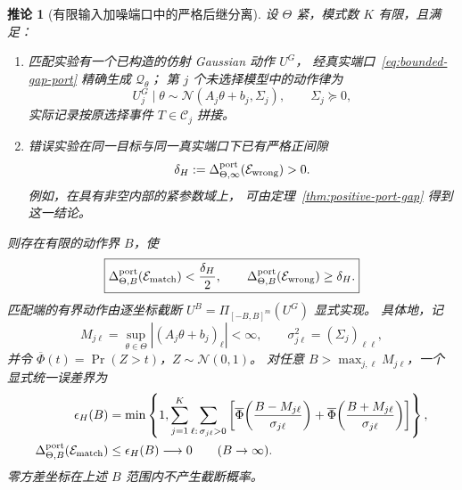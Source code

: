 \documentclass[UTF8,fontset=fandol,zihao=5,a4paper]{ctexart}
\newtheorem{corollary}[theorem]{推论}
\theoremstyle{definition}
\theoremstyle{remark}\newtheorem{remark}[theorem]{说明}
\numberwithin{equation}{section}
\begin{document}
\begin{corollary}[有限输入加噪端口中的严格后继分离]
\label{cor:bounded-port-separation}
设 $\Theta$ 紧，模式数 $K$ 有限，且满足：
\begin{enumerate}
\item 匹配实验有一个已构造的仿射 Gaussian 动作 $U^G$，
      经真实端口~\eqref{eq:bounded-gap-port} 精确生成 $\mathcal Q_\theta$；
      第 $j$ 个未选择模型中的动作律为
      \[
       U_j^G\mid\theta\sim
       \mathcal N(A_j\theta+b_j,\Sigma_j),\qquad \Sigma_j\succeq0,
      \]
      实际记录按原选择事件 $T\in\mathcal C_j$ 拼接。
\item 错误实验在同一目标与同一真实端口下已有严格正间隙
      \[
       \delta_H:=\Delta_{\Theta,\infty}^{\rm port}
                         (\mathcal E_{\rm wrong})>0.
      \]
      例如，在具有非空内部的紧参数域上，
      可由定理~\ref{thm:positive-port-gap} 得到这一结论。
\end{enumerate}
则存在有限的动作界 $B$，使
\begin{equation}
 \boxed{
 \Delta_{\Theta,B}^{\rm port}(\mathcal E_{\rm match})
 <\frac{\delta_H}{2},\qquad
 \Delta_{\Theta,B}^{\rm port}(\mathcal E_{\rm wrong})
 \ge\delta_H.}
 \label{eq:bounded-gap-separation}
\end{equation}
匹配端的有界动作由逐坐标截断
$U^B=\Pi_{[-B,B]^m}(U^G)$ 显式实现。
具体地，记
\begin{equation}
 M_{j\ell}=\sup_{\theta\in\Theta}
       |(A_j\theta+b_j)_\ell|<\infty,
 \qquad \sigma_{j\ell}^2=(\Sigma_j)_{\ell\ell},
 \label{eq:bounded-gap-moments}
\end{equation}
并令 $\overline\Phi(t)=\Pr(Z>t)$，$Z\sim\mathcal N(0,1)$。
对任意 $B>\max_{j,\ell}M_{j\ell}$，一个显式统一误差界为
\begin{align}
 \epsilon_H(B)
 &=\min\left\{1,
 \sum_{j=1}^{K}\sum_{\ell:\,\sigma_{j\ell}>0}
 \left[
 \overline\Phi\!\left(\frac{B-M_{j\ell}}{\sigma_{j\ell}}\right)
 +\overline\Phi\!\left(\frac{B+M_{j\ell}}{\sigma_{j\ell}}\right)
 \right]\right\},
 \label{eq:bounded-gap-tail}\\
 \Delta_{\Theta,B}^{\rm port}(\mathcal E_{\rm match})
 &\le\epsilon_H(B)\longrightarrow0\qquad(B\to\infty).
 \label{eq:bounded-gap-match-bound}
\end{align}
零方差坐标在上述 $B$ 范围内不产生截断概率。
\end{corollary}
\end{document}
